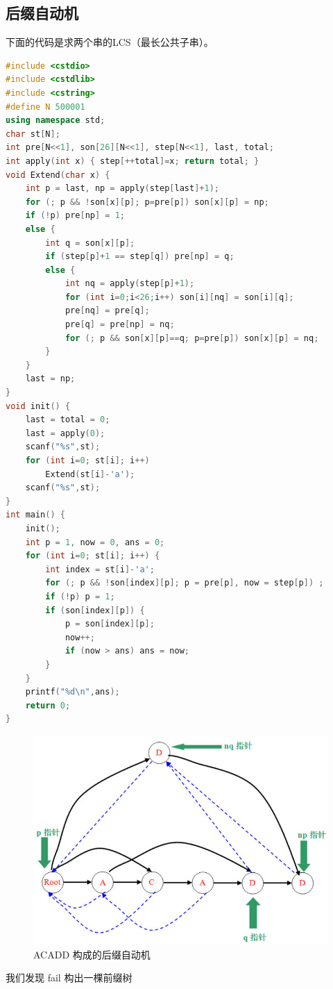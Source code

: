 \documentclass{article}
\begin{document}
\subsection{后缀自动机}
下面的代码是求两个串的LCS（最长公共子串）。
\begin{lstlisting}[language=C++]
#include <cstdio>
#include <cstdlib>
#include <cstring>
#define N 500001
using namespace std;
char st[N];
int pre[N<<1], son[26][N<<1], step[N<<1], last, total;
int apply(int x) { step[++total]=x; return total; }
void Extend(char x) {
	int p = last, np = apply(step[last]+1);
	for (; p && !son[x][p]; p=pre[p]) son[x][p] = np;
	if (!p) pre[np] = 1;
	else {
		int q = son[x][p];
		if (step[p]+1 == step[q]) pre[np] = q;
		else {
			int nq = apply(step[p]+1);
			for (int i=0;i<26;i++) son[i][nq] = son[i][q];
			pre[nq] = pre[q];
			pre[q] = pre[np] = nq;
			for (; p && son[x][p]==q; p=pre[p]) son[x][p] = nq;
		}
	}
	last = np;
}
void init() {
	last = total = 0;
	last = apply(0);
	scanf("%s",st);
	for (int i=0; st[i]; i++)
		Extend(st[i]-'a');
	scanf("%s",st);
}
int main() {
	init();
	int p = 1, now = 0, ans = 0;
	for (int i=0; st[i]; i++) {
		int index = st[i]-'a';
		for (; p && !son[index][p]; p = pre[p], now = step[p]) ;
		if (!p) p = 1;
		if (son[index][p]) {
			p = son[index][p];
			now++;
			if (now > ans) ans = now;
		}
	}
	printf("%d\n",ans);
	return 0;
}
\end{lstlisting}
\begin{figure}[htbp]
  \centering
  \includegraphics[scale=0.6]{suffix_auto.jpg}
  \caption{ACADD 构成的后缀自动机}
  \label{suffix_auto}
\end{figure}

我们发现 fail 构出一棵前缀树
\end{document}
